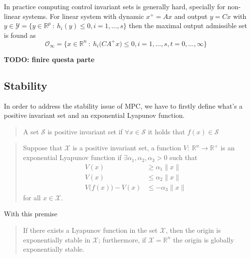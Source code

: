 	In practice computing control invariant sets is generally hard, specially for non-linear systems. For linear system with dynamic $x^+ = A x$ and output $y = Cx$ with $y \in \mathcal Y = \big\{ y \in \mathds R^p \ : \ h_i(y) \leq 0, i =1,\dots, s \big\}$ then the maximal output admissible set is found as
	\[ \mathcal O_\infty = \big\{ x \in \mathds R^n \ : \ h_i\big(CA^+ x\big) \leq 0, i = 1,\dots, s, t = 0,\dots, \infty \big\} \]
	
	\textbf{TODO: finire questa parte}
	
\subsection{Stability}
	In order to address the stability issue of MPC, we have to firstly define what's a positive invariant set and an exponential Lyapunov function.
	\begin{quote}
		A set $\mathcal S$ is positive invariant set if $\forall x \in \mathcal S$ it holds that $f(x) \in \mathcal S$
	\end{quote}
	\begin{quote}
		Suppose that $\mathcal X$ is a positive invariant set, a function $V:\ \mathds R^n \rightarrow \mathds R^+$ is an exponential Lyapunov function if $\exists \alpha_1,\alpha_2,\alpha_3 > 0$ such that
		\begin{align*}
			V(x) & \geq \alpha_1 \|x\| \\
			V(x) & \leq \alpha_2 \|x\| \\
			V\big(f(x)\big) - V(x) & \leq - \alpha_3 \|x\|
		\end{align*}
		for all $x \in \mathcal X$.
	\end{quote}
	With this premise
	\begin{quote}
		If there exists a Lyapunov function in the set $\mathcal X$, then the origin is exponentially stable in $\mathcal X$; furthermore, if $\mathcal X = \mathds R^n$ the origin is globally exponentially stable.
	\end{quote}
	
